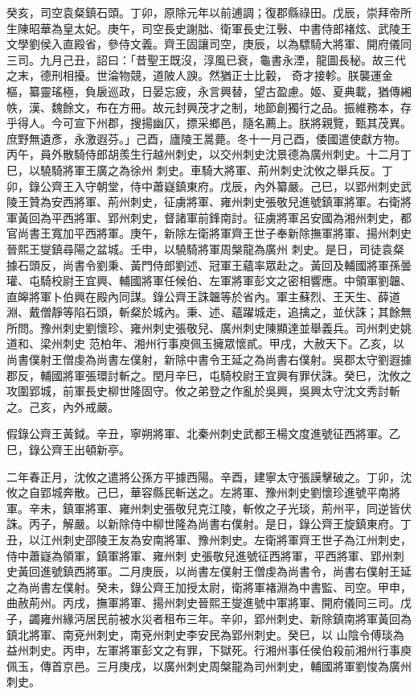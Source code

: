 \begin{pinyinscope}
 癸亥，司空袁粲鎮石頭。丁卯，原除元年以前逋調；復郡縣祿田。戊辰，崇拜帝所生陳昭華為皇太妃。庚午，司空長史謝朏、衛軍長史江斅、中書侍郎褚炫、武陵王文學劉侯入直殿省，參侍文義。齊王固讓司空，庚辰，以為驃騎大將軍、開府儀同三司。九月己丑，詔曰：「昔聖王既沒，淳風已衰，龜書永湮，龍圖長秘。故三代之末，德刑相擾。世淪物競，道陂人諛。然猶正士比轂，
 奇才接軫。朕襲運金樞，纂靈瑤極，負扆巡政，日晏忘疲，永言興替，望古盈慮。姬、夏典載，猶傳緗帙，漢、魏餘文，布在方冊。故元封興茂才之制，地節創獨行之品。振維務本，存乎得人。今可宣下州郡，搜揚幽仄，摽采鄉邑，隨名薦上。朕將親覽，甄其茂異。庶野無遺彥，永激遐芬。」己酉，廬陵王暠薨。冬十一月己酉，倭國遣使獻方物。丙午，員外散騎侍郎胡羨生行越州刺史，以交州刺史沈景德為廣州刺史。十二月丁巳，以驍騎將軍王廣之為徐州
 刺史。車騎大將軍、荊州刺史沈攸之舉兵反。丁卯，錄公齊王入守朝堂，侍中蕭嶷鎮東府。戊辰，內外纂嚴。己巳，以郢州刺史武陵王贊為安西將軍、荊州刺史，征虜將軍、雍州刺史張敬兒進號鎮軍將軍。右衛將軍黃回為平西將軍、郢州刺史，督諸軍前鋒南討。征虜將軍呂安國為湘州刺史，都官尚書王寬加平西將軍。庚午，新除左衛將軍齊王世子奉新除撫軍將軍、揚州刺史晉熙王燮鎮尋陽之盆城。壬申，以驍騎將軍周槃龍為廣州
 刺史。是日，司徒袁粲據石頭反，尚書令劉秉、黃門侍郎劉述、冠軍王蘊率眾赴之。黃回及輔國將軍孫曇瓘、屯騎校尉王宜興、輔國將軍任候伯、左軍將軍彭文之密相響應。中領軍劉韞、直皞將軍卜伯興在殿內同謀。錄公齊王誅韞等於省內。軍主蘇烈、王天生、薛道淵、戴僧靜等陷石頭，斬粲於城內。秉、述、蘊躍城走，追擒之，並伏誅；其餘無所問。豫州刺史劉懷珍、雍州刺史張敬兒、廣州刺史陳顯達並舉義兵。司州刺史姚道和、梁州刺史
 范柏年、湘州行事庾佩玉擁眾懷貳。甲戌，大赦天下。乙亥，以尚書僕射王僧虔為尚書左僕射，新除中書令王延之為尚書右僕射。吳郡太守劉遐據郡反，輔國將軍張環討斬之。閏月辛巳，屯騎校尉王宜興有罪伏誅。癸巳，沈攸之攻圍郢城，前軍長史柳世隆固守。攸之弟登之作亂於吳興，吳興太守沈文秀討斬之。己亥，內外戒嚴。



 假錄公齊王黃鉞。辛丑，寧朔將軍、北秦州刺史武都王楊文度進號征西將軍。乙巳，錄公齊王出頓新亭。



 二年春正月，沈攸之遣將公孫方平據西陽。辛酉，建寧太守張謨擊破之。丁卯，沈攸之自郢城奔散。己巳，華容縣民斬送之。左將軍、豫州刺史劉懷珍進號平南將軍。辛未，鎮軍將軍、雍州刺史張敬兒克江陵，斬攸之子光琰，荊州平，同逆皆伏誅。丙子，解嚴。以新除侍中柳世隆為尚書右僕射。是日，錄公齊王旋鎮東府。丁丑，以江州刺史邵陵王友為安南將軍、豫州刺史。左衛將軍齊王世子為江州刺史，侍中蕭嶷為領軍，鎮軍將軍、雍州刺
 史張敬兒進號征西將軍，平西將軍、郢州刺史黃回進號鎮西將軍。二月庚辰，以尚書左僕射王僧虔為尚書令，尚書右僕射王延之為尚書左僕射。癸未，錄公齊王加授太尉，衛將軍褚淵為中書監、司空。甲申，曲赦荊州。丙戌，撫軍將軍、揚州刺史晉熙王燮進號中軍將軍、開府儀同三司。戊子，蠲雍州緣沔居民前被水災者租布三年。辛卯，郢州刺史、新除鎮南將軍黃回為鎮北將軍、南兗州刺史，南兗州刺史李安民為郢州刺史。癸巳，以
 山陰令傅琰為益州刺史。丙申，左軍將軍彭文之有罪，下獄死。行湘州事任侯伯殺前湘州行事庾佩玉，傳首京邑。三月庚戌，以廣州刺史周槃龍為司州刺史，輔國將軍劉悛為廣州刺史。




\end{pinyinscope}
